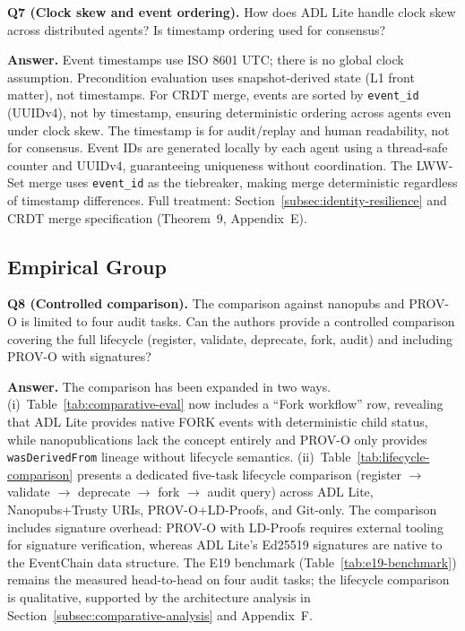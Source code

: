 \textbf{Q7 (Clock skew and event ordering).} How does ADL Lite handle clock skew across distributed agents? Is timestamp ordering used for consensus?

\textbf{Answer.} Event timestamps use ISO 8601 UTC; there is no global clock assumption. Precondition evaluation uses snapshot-derived state (L1 front matter), not timestamps. For CRDT merge, events are sorted by \texttt{event\_id} (UUIDv4), not by timestamp, ensuring deterministic ordering across agents even under clock skew. The timestamp is for audit/replay and human readability, not for consensus. Event IDs are generated locally by each agent using a thread-safe counter and UUIDv4, guaranteeing uniqueness without coordination. The LWW-Set merge uses \texttt{event\_id} as the tiebreaker, making merge deterministic regardless of timestamp differences. Full treatment: Section~\ref{subsec:identity-resilience} and CRDT merge specification (Theorem~9, Appendix~E).

\subsection{Empirical Group}\label{subsec:response-empirical}

\textbf{Q8 (Controlled comparison).} The comparison against nanopubs and PROV-O is limited to four audit tasks. Can the authors provide a controlled comparison covering the full lifecycle (register, validate, deprecate, fork, audit) and including PROV-O with signatures?

\textbf{Answer.} The comparison has been expanded in two ways. (i)~Table~\ref{tab:comparative-eval} now includes a ``Fork workflow'' row, revealing that ADL Lite provides native \textsc{FORK} events with deterministic child status, while nanopublications lack the concept entirely and PROV-O only provides \texttt{wasDerivedFrom} lineage without lifecycle semantics. (ii)~Table~\ref{tab:lifecycle-comparison} presents a dedicated five-task lifecycle comparison (register $\to$ validate $\to$ deprecate $\to$ fork $\to$ audit query) across ADL Lite, Nanopubs+Trusty URIs, PROV-O+LD-Proofs, and Git-only. The comparison includes signature overhead: PROV-O with LD-Proofs requires external tooling for signature verification, whereas ADL Lite's Ed25519 signatures are native to the EventChain data structure. The E19 benchmark (Table~\ref{tab:e19-benchmark}) remains the measured head-to-head on four audit tasks; the lifecycle comparison is qualitative, supported by the architecture analysis in Section~\ref{subsec:comparative-analysis} and Appendix~F.

